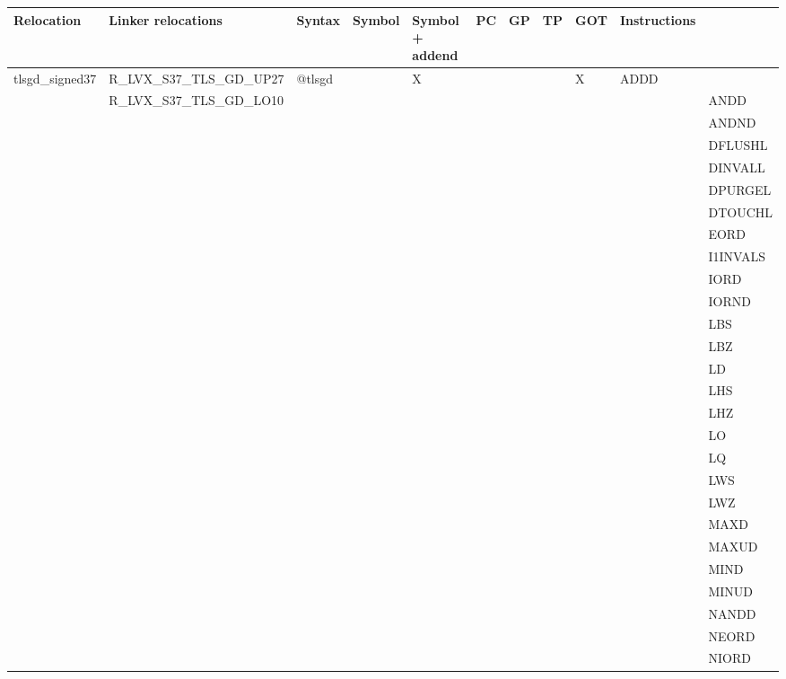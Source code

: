{\tiny
\begin{tabular}{|l|l|l|l|l|l|l|l|l|l|l|} \hline
\textsf{Relocation} & \textsf{Linker relocations} & \textsf{Syntax} & \textsf{Symbol} & \textsf{Symbol + addend} & \textsf{PC} & \textsf{GP} & \textsf{TP} & \textsf{GOT} & \textsf{Instructions} \\
\hline
\textsf{tlsgd\_signed37} & \textsf{R\_LVX\_S37\_TLS\_GD\_UP27} & \textsf{@tlsgd} & \textsf{} & \textsf{X} & \textsf{} & \textsf{} & \textsf{} & \textsf{X} & \textsf{ADDD} \\
 & \textsf{R\_LVX\_S37\_TLS\_GD\_LO10} & & & & & & & & & \textsf{ANDD} \\
 & & & & & & & & & & \textsf{ANDND} \\
 & & & & & & & & & & \textsf{DFLUSHL} \\
 & & & & & & & & & & \textsf{DINVALL} \\
 & & & & & & & & & & \textsf{DPURGEL} \\
 & & & & & & & & & & \textsf{DTOUCHL} \\
 & & & & & & & & & & \textsf{EORD} \\
 & & & & & & & & & & \textsf{I1INVALS} \\
 & & & & & & & & & & \textsf{IORD} \\
 & & & & & & & & & & \textsf{IORND} \\
 & & & & & & & & & & \textsf{LBS} \\
 & & & & & & & & & & \textsf{LBZ} \\
 & & & & & & & & & & \textsf{LD} \\
 & & & & & & & & & & \textsf{LHS} \\
 & & & & & & & & & & \textsf{LHZ} \\
 & & & & & & & & & & \textsf{LO} \\
 & & & & & & & & & & \textsf{LQ} \\
 & & & & & & & & & & \textsf{LWS} \\
 & & & & & & & & & & \textsf{LWZ} \\
 & & & & & & & & & & \textsf{MAXD} \\
 & & & & & & & & & & \textsf{MAXUD} \\
 & & & & & & & & & & \textsf{MIND} \\
 & & & & & & & & & & \textsf{MINUD} \\
 & & & & & & & & & & \textsf{NANDD} \\
 & & & & & & & & & & \textsf{NEORD} \\
 & & & & & & & & & & \textsf{NIORD} \\

\end{tabular}}
